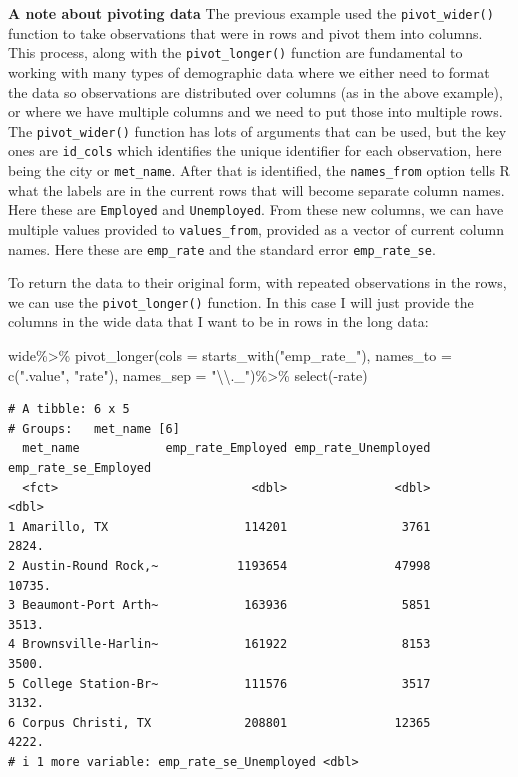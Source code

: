 \documentclass[
  letterpaper,
  DIV=11,
  numbers=noendperiod]{scrreprt}
\newenvironment{Shaded}{\begin{snugshade}}{\end{snugshade}}
\newcommand{\AttributeTok}[1]{\textcolor[rgb]{0.40,0.45,0.13}{#1}}
\newcommand{\FunctionTok}[1]{\textcolor[rgb]{0.28,0.35,0.67}{#1}}
\newcommand{\NormalTok}[1]{\textcolor[rgb]{0.00,0.23,0.31}{#1}}
\newcommand{\SpecialCharTok}[1]{\textcolor[rgb]{0.37,0.37,0.37}{#1}}
\newcommand{\StringTok}[1]{\textcolor[rgb]{0.13,0.47,0.30}{#1}}
\begin{document}
\textbf{A note about pivoting data} The previous example used the
\texttt{pivot\_wider()} function to take observations that were in rows
and pivot them into columns. This process, along with the
\texttt{pivot\_longer()} function are fundamental to working with many
types of demographic data where we either need to format the data so
observations are distributed over columns (as in the above example), or
where we have multiple columns and we need to put those into multiple
rows. The \texttt{pivot\_wider()} function has lots of arguments that
can be used, but the key ones are \texttt{id\_cols} which identifies the
unique identifier for each observation, here being the city or
\texttt{met\_name}. After that is identified, the \texttt{names\_from}
option tells R what the labels are in the current rows that will become
separate column names. Here these are \texttt{Employed} and
\texttt{Unemployed}. From these new columns, we can have multiple values
provided to \texttt{values\_from}, provided as a vector of current
column names. Here these are \texttt{emp\_rate} and the standard error
\texttt{emp\_rate\_se}.

To return the data to their original form, with repeated observations in
the rows, we can use the \texttt{pivot\_longer()} function. In this case
I will just provide the columns in the wide data that I want to be in
rows in the long data:

\begin{Shaded}
\begin{Highlighting}[]
\NormalTok{wide}\SpecialCharTok{\%\textgreater{}\%}
  \FunctionTok{pivot\_longer}\NormalTok{(}\AttributeTok{cols =} \FunctionTok{starts\_with}\NormalTok{(}\StringTok{"emp\_rate\_"}\NormalTok{), }
               \AttributeTok{names\_to =} \FunctionTok{c}\NormalTok{(}\StringTok{".value"}\NormalTok{, }\StringTok{"rate"}\NormalTok{),}
               \AttributeTok{names\_sep =} \StringTok{"}\SpecialCharTok{\textbackslash{}\textbackslash{}}\StringTok{.\_"}\NormalTok{)}\SpecialCharTok{\%\textgreater{}\%}
  \FunctionTok{select}\NormalTok{(}\SpecialCharTok{{-}}\NormalTok{rate)}
\end{Highlighting}
\end{Shaded}

\begin{verbatim}
# A tibble: 6 x 5
# Groups:   met_name [6]
  met_name            emp_rate_Employed emp_rate_Unemployed emp_rate_se_Employed
  <fct>                           <dbl>               <dbl>                <dbl>
1 Amarillo, TX                   114201                3761                2824.
2 Austin-Round Rock,~           1193654               47998               10735.
3 Beaumont-Port Arth~            163936                5851                3513.
4 Brownsville-Harlin~            161922                8153                3500.
5 College Station-Br~            111576                3517                3132.
6 Corpus Christi, TX             208801               12365                4222.
# i 1 more variable: emp_rate_se_Unemployed <dbl>
\end{verbatim}
\end{document}
